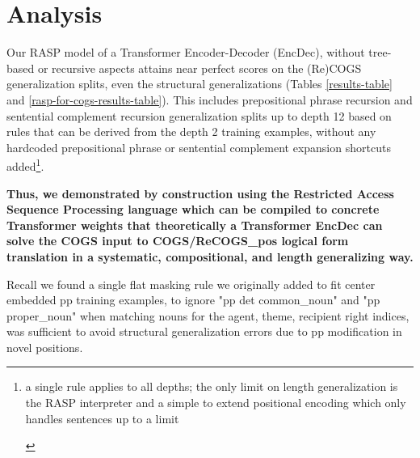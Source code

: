 \documentclass[11pt]{article}
\begin{document}
\section{Analysis} 
Our RASP model of a Transformer Encoder-Decoder (EncDec), without tree-based or recursive aspects attains near perfect scores on the (Re)COGS generalization splits, even the structural generalizations (Tables \ref{results-table} and \ref{rasp-for-cogs-results-table}). This includes prepositional phrase recursion and sentential complement recursion generalization splits up to depth 12 based on rules that can be derived from the depth 2 training examples, without any hardcoded prepositional phrase or sentential complement expansion shortcuts added\footnote{\begin{footnotesize}a single rule applies to all depths; the only limit on length generalization is the RASP interpreter and a simple to extend positional encoding which only handles sentences up to a limit\end{footnotesize}}. 

\textbf{Thus, we demonstrated by construction using the Restricted Access Sequence Processing language which can be compiled to concrete Transformer weights that theoretically a Transformer EncDec can solve the COGS input to COGS/ReCOGS\_pos logical form translation in a systematic, compositional, and length generalizing way.}

Recall we found a single flat masking rule we originally added to fit center embedded pp training examples, to ignore "pp det common\_noun" and "pp proper\_noun" when matching nouns for the agent, theme, recipient right indices, was sufficient to avoid structural generalization errors due to pp modification in novel positions. 
\end{document}
